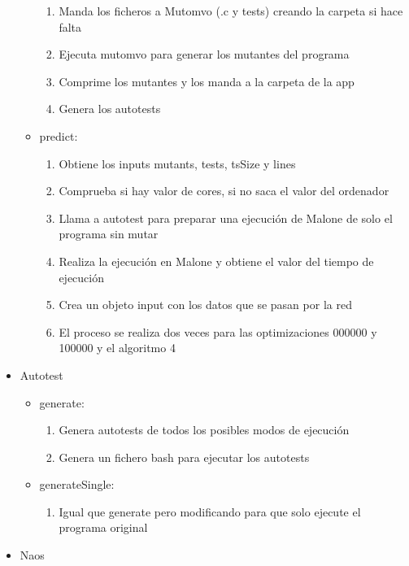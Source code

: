 \documentclass{article}
\begin{document}
\begin{itemize}
\begin{itemize}
\begin{enumerate}
                \item Manda los ficheros a Mutomvo (.c y tests) creando la carpeta si hace falta
                \item Ejecuta mutomvo para generar los mutantes del programa
                \item Comprime los mutantes y los manda a la carpeta de la app
                \item Genera los autotests
            \end{enumerate}
            \item predict:
            \begin{enumerate}
                \item Obtiene los inputs mutants, tests, tsSize y lines
                \item Comprueba si hay valor de cores, si no saca el valor del ordenador
                \item Llama a autotest para preparar una ejecución de Malone de solo el programa sin mutar
                \item Realiza la ejecución en Malone y obtiene el valor del tiempo de ejecución
                \item Crea un objeto input con los datos que se pasan por la red
                \item El proceso se realiza dos veces para las optimizaciones 000000 y 100000 y el algoritmo 4
            \end{enumerate}
            \end{itemize}
        \item Autotest
            \begin{itemize}
            \item generate:
            \begin{enumerate}
                \item Genera autotests de todos los posibles modos de ejecución
                \item Genera un fichero bash para ejecutar los autotests
            \end{enumerate}
            \item generateSingle:
            \begin{enumerate}
                \item Igual que generate pero modificando para que solo ejecute el programa original
            \end{enumerate}
            \end{itemize}
    \item Naos

\end{itemize}
\end{document}
